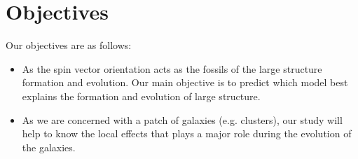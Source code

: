 \section{Objectives}
Our objectives are as follows:
\begin{itemize}
\item As the spin vector orientation acts as the fossils of the large structure formation and evolution. Our main objective is to predict which model best explains the formation and evolution of large structure.
\item As we are concerned with a patch of galaxies (e.g. clusters), our study will help to know the local effects that plays a major role during the evolution of the galaxies.
\end{itemize}
